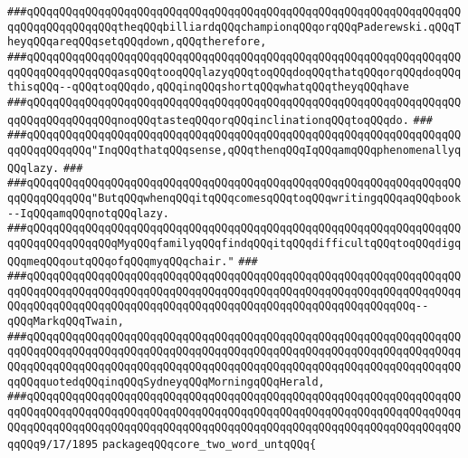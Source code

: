 \verb|###qQQqqQQqqQQqqQQqqQQqqQQqqQQqqQQqqQQqqQQqqQQqqQQqqQQqqQQqqQQqqQQqqQQqqQQqqQQqqQQqqQQqtheqQQqbilliardqQQqchampionqQQqorqQQqPaderewski.qQQqTheyqQQqareqQQqsetqQQqdown,qQQqtherefore,|\newline
\verb|###qQQqqQQqqQQqqQQqqQQqqQQqqQQqqQQqqQQqqQQqqQQqqQQqqQQqqQQqqQQqqQQqqQQqqQQqqQQqqQQqqQQqasqQQqtooqQQqlazyqQQqtoqQQqdoqQQqthatqQQqorqQQqdoqQQqthisqQQq--qQQqtoqQQqdo,qQQqinqQQqshortqQQqwhatqQQqtheyqQQqhave|\newline
\verb|###qQQqqQQqqQQqqQQqqQQqqQQqqQQqqQQqqQQqqQQqqQQqqQQqqQQqqQQqqQQqqQQqqQQqqQQqqQQqqQQqqQQqnoqQQqtasteqQQqorqQQqinclinationqQQqtoqQQqdo.|\newline
\verb|###|\newline
\verb|###qQQqqQQqqQQqqQQqqQQqqQQqqQQqqQQqqQQqqQQqqQQqqQQqqQQqqQQqqQQqqQQqqQQqqQQqqQQqqQQq"InqQQqthatqQQqsense,qQQqthenqQQqIqQQqamqQQqphenomenallyqQQqlazy.|\newline
\verb|###|\newline
\verb|###qQQqqQQqqQQqqQQqqQQqqQQqqQQqqQQqqQQqqQQqqQQqqQQqqQQqqQQqqQQqqQQqqQQqqQQqqQQqqQQq"ButqQQqwhenqQQqitqQQqcomesqQQqtoqQQqwritingqQQqaqQQqbook--IqQQqamqQQqnotqQQqlazy.|\newline
\verb|###qQQqqQQqqQQqqQQqqQQqqQQqqQQqqQQqqQQqqQQqqQQqqQQqqQQqqQQqqQQqqQQqqQQqqQQqqQQqqQQqqQQqMyqQQqfamilyqQQqfindqQQqitqQQqdifficultqQQqtoqQQqdigqQQqmeqQQqoutqQQqofqQQqmyqQQqchair."|\newline
\verb|###|\newline
\verb|###qQQqqQQqqQQqqQQqqQQqqQQqqQQqqQQqqQQqqQQqqQQqqQQqqQQqqQQqqQQqqQQqqQQqqQQqqQQqqQQqqQQqqQQqqQQqqQQqqQQqqQQqqQQqqQQqqQQqqQQqqQQqqQQqqQQqqQQqqQQqqQQqqQQqqQQqqQQqqQQqqQQqqQQqqQQqqQQqqQQqqQQqqQQqqQQqqQQqqQQq--qQQqMarkqQQqTwain,|\newline
\verb|###qQQqqQQqqQQqqQQqqQQqqQQqqQQqqQQqqQQqqQQqqQQqqQQqqQQqqQQqqQQqqQQqqQQqqQQqqQQqqQQqqQQqqQQqqQQqqQQqqQQqqQQqqQQqqQQqqQQqqQQqqQQqqQQqqQQqqQQqqQQqqQQqqQQqqQQqqQQqqQQqqQQqqQQqqQQqqQQqqQQqqQQqqQQqqQQqqQQqqQQqqQQqqQQqqQQqquotedqQQqinqQQqSydneyqQQqMorningqQQqHerald,|\newline
\verb|###qQQqqQQqqQQqqQQqqQQqqQQqqQQqqQQqqQQqqQQqqQQqqQQqqQQqqQQqqQQqqQQqqQQqqQQqqQQqqQQqqQQqqQQqqQQqqQQqqQQqqQQqqQQqqQQqqQQqqQQqqQQqqQQqqQQqqQQqqQQqqQQqqQQqqQQqqQQqqQQqqQQqqQQqqQQqqQQqqQQqqQQqqQQqqQQqqQQqqQQqqQQqqQQqqQQq9/17/1895|\newline
\newline
\newline
\newline
\verb|packageqQQqcore_two_word_untqQQq{|\newline

